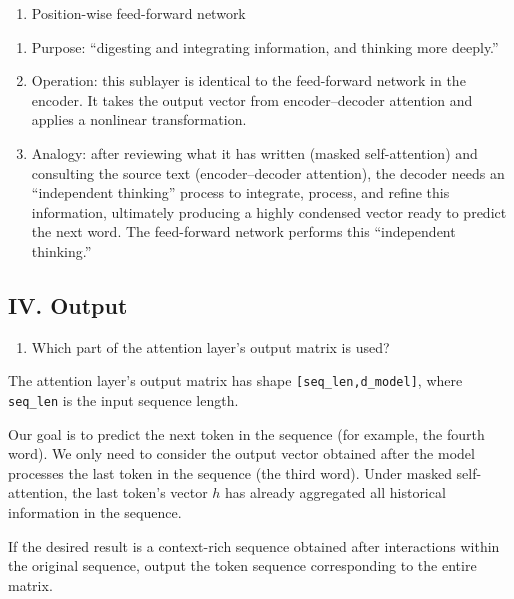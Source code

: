 \begin{enumerate}
\def\labelenumi{\arabic{enumi}.}
\setcounter{enumi}{2}
\tightlist
\item
  Position-wise feed-forward network
\end{enumerate}

\begin{enumerate}
\def\labelenumi{(\arabic{enumi})}
\item
  Purpose: ``digesting and integrating information, and thinking more deeply.''
\item
  Operation: this sublayer is identical to the feed-forward network in the encoder. It takes the output vector from encoder--decoder attention and applies a nonlinear transformation.
\item
  Analogy: after reviewing what it has written (masked self-attention) and consulting the source text (encoder--decoder attention), the decoder needs an ``independent thinking'' process to integrate, process, and refine this information, ultimately producing a highly condensed vector ready to predict the next word. The feed-forward network performs this ``independent thinking.''
\end{enumerate}

\hypertarget{iv.-output}{%
\subsection{IV. Output}\label{iv.-output}}

\begin{enumerate}
\def\labelenumi{\arabic{enumi}.}
\tightlist
\item
  Which part of the attention layer's output matrix is used?
\end{enumerate}

The attention layer's output matrix has shape \texttt{{[}seq\_len,d\_model{]}}, where \texttt{seq\_len} is the input sequence length.

Our goal is to predict the next token in the sequence (for example, the fourth word). We only need to consider the output vector obtained after the model processes the last token in the sequence (the third word). Under masked self-attention, the last token's vector \(h\) has already aggregated all historical information in the sequence.

If the desired result is a context-rich sequence obtained after interactions within the original sequence, output the token sequence corresponding to the entire matrix.

